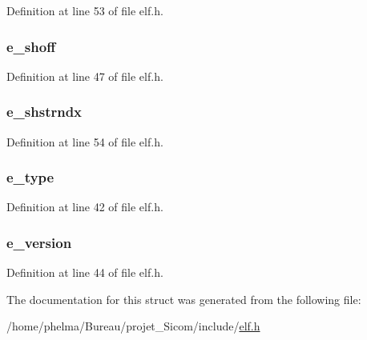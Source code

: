 Definition at line 53 of file elf.\-h.

\hypertarget{struct_elf32___ehdr_ad1cb2a7b39b5465b19922fcd2a449ee1}{
\subsubsection[{e\-\_\-shoff}]{ e\-\_\-shoff}}\label{struct_elf32___ehdr_ad1cb2a7b39b5465b19922fcd2a449ee1}


Definition at line 47 of file elf.\-h.

\hypertarget{struct_elf32___ehdr_a70716c059a9a377dd31b958722f5e947}{
\subsubsection[{e\-\_\-shstrndx}]{ e\-\_\-shstrndx}}\label{struct_elf32___ehdr_a70716c059a9a377dd31b958722f5e947}


Definition at line 54 of file elf.\-h.

\hypertarget{struct_elf32___ehdr_a7f0b549920bf4fc78b5ca36a17dc50b3}{
\subsubsection[{e\-\_\-type}]{ e\-\_\-type}}\label{struct_elf32___ehdr_a7f0b549920bf4fc78b5ca36a17dc50b3}


Definition at line 42 of file elf.\-h.

\hypertarget{struct_elf32___ehdr_af3c8fac8345400aef61da74b2de320c8}{
\subsubsection[{e\-\_\-version}]{ e\-\_\-version}}\label{struct_elf32___ehdr_af3c8fac8345400aef61da74b2de320c8}


Definition at line 44 of file elf.\-h.



The documentation for this struct was generated from the following file\-:\begin{DoxyCompactItemize}
\item 
/home/phelma/\-Bureau/projet\-\_\-\-Sicom/include/\hyperlink{elf_8h}{elf.\-h}\end{DoxyCompactItemize}
